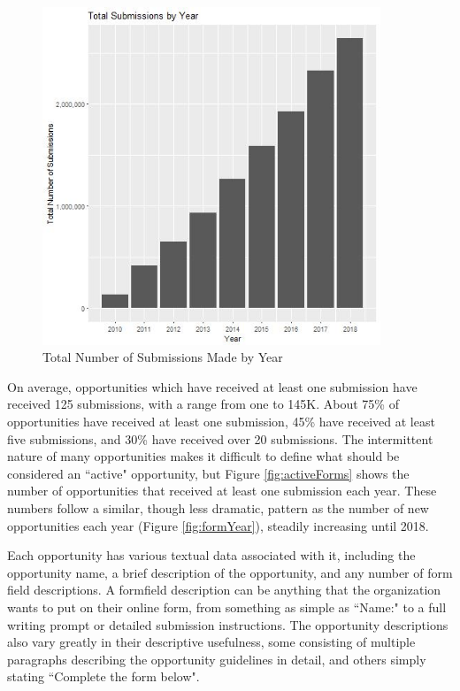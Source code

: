 \documentclass[]{report}   %
\begin{document}
\begin{figure}
\begin{minipage}{0.45\textwidth}
        \includegraphics[width=0.9\textwidth]{subsByYear_plot.jpg} %
        \caption{Total Number of Submissions Made by Year}
	  \label{fig:subYear}
    \end{minipage}
\end{figure}
\FloatBarrier
On average, opportunities which have received at least one submission have received 125 submissions, with a range from one to 145K. About 75\% of opportunities have received at least one submission, 45\% have received at least five submissions, and 30\% have received over 20 submissions. The intermittent nature of many opportunities makes it difficult to define what should be considered an ``active" opportunity, but Figure \ref{fig:activeForms} shows the number of opportunities that received at least one submission each year. These numbers follow a similar, though less dramatic, pattern as the number of new opportunities each year (Figure \ref{fig:formYear}), steadily increasing until 2018.

Each opportunity has various textual data associated with it, including the opportunity name, a brief description of the opportunity, and any number of form field descriptions. A formfield description can be anything that the organization wants to put on their online form, from something as simple as ``Name:" to a full writing prompt or detailed submission instructions. The opportunity descriptions also vary greatly in their descriptive usefulness, some consisting of multiple paragraphs describing the opportunity guidelines in detail, and others simply stating ``Complete the form below". 
\end{document}

